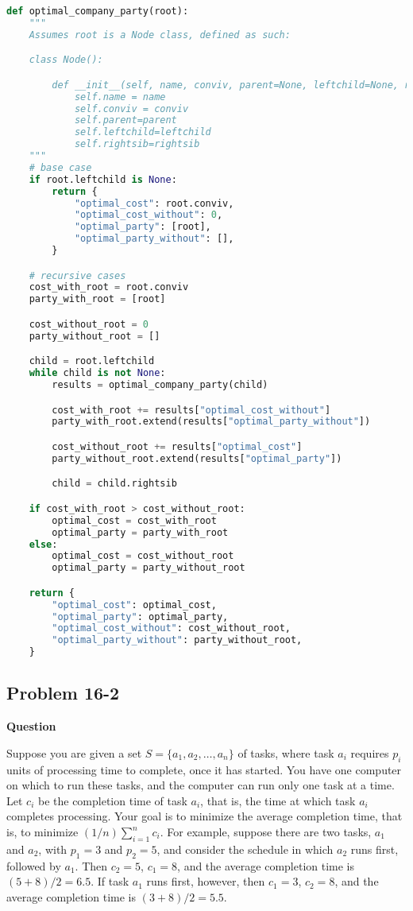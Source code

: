 \documentclass[]{book}
\theoremstyle{definition}
\begin{document}
\clearpage
\begin{lstlisting}[language=Python, caption=Optimal Party Algorithm, label=snip:optimalparty]
def optimal_company_party(root):
    """
    Assumes root is a Node class, defined as such:

    class Node():

        def __init__(self, name, conviv, parent=None, leftchild=None, rightsib=None):
            self.name = name
            self.conviv = conviv
            self.parent=parent
            self.leftchild=leftchild
            self.rightsib=rightsib
    """
    # base case
    if root.leftchild is None:
        return {
            "optimal_cost": root.conviv,
            "optimal_cost_without": 0,
            "optimal_party": [root],
            "optimal_party_without": [],
        }

    # recursive cases
    cost_with_root = root.conviv
    party_with_root = [root]

    cost_without_root = 0
    party_without_root = []

    child = root.leftchild
    while child is not None:
        results = optimal_company_party(child)

        cost_with_root += results["optimal_cost_without"]
        party_with_root.extend(results["optimal_party_without"])

        cost_without_root += results["optimal_cost"]
        party_without_root.extend(results["optimal_party"])

        child = child.rightsib

    if cost_with_root > cost_without_root:
        optimal_cost = cost_with_root
        optimal_party = party_with_root
    else:
        optimal_cost = cost_without_root
        optimal_party = party_without_root

    return {
        "optimal_cost": optimal_cost,
        "optimal_party": optimal_party,
        "optimal_cost_without": cost_without_root,
        "optimal_party_without": party_without_root,
    }\end{lstlisting}
\clearpage

\subsection*{Problem 16-2}

\textbf{Question} 

Suppose you are given a set $S = \{a_1, a_2,\dots,a_n\}$ of tasks, 
where task $a_i$ requires $p_i$ units of processing time to complete, 
once it has started. 
You have one computer on which to run these tasks, 
and the computer can run only one task at a
time. Let $c_i$ be the completion time of task $a_i$, 
that is, the time at which task $a_i$ completes processing. 
Your goal is to minimize the average completion time, that is,
to minimize $(1/n) \sum_{i=1}^n c_i$.
For example, suppose there are two tasks, $a_1$ and $a_2$,
with $p_1 = 3$ and $p_2 = 5$, and consider the schedule in which $a_2$ runs first, followed
by $a_1$. Then $c_2 = 5$, $c_1 = 8$, 
and the average completion time is $(5+8)/2 = 6.5$.
If task $a_1$ runs first, however, then $c_1 = 3$, $c_2 = 8$, 
and the average completion time is $(3 + 8) / 2 = 5.5$.
\end{document}
